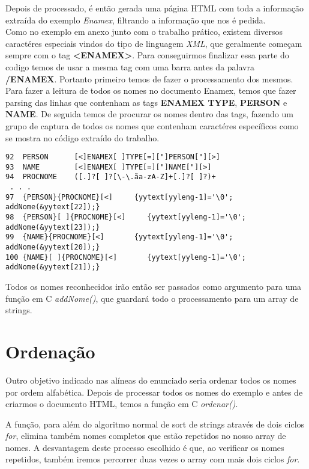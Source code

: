 \documentclass[11pt,a4paper]{report}
\begin{document}
Depois de processado, é então gerada uma página HTML com toda a informação extraída do exemplo \textit{Enamex}, filtrando a informação que nos é pedida.
~\\
Como no exemplo em anexo junto com o trabalho prático, existem diversos caractéres especiais vindos do tipo de linguagem \textit{XML}, que geralmente começam sempre com o tag \textbf{<ENAMEX>}. Para conseguirmos finalizar essa parte do codigo temos de usar a mesma tag com uma barra antes da palavra \textbf{/ENAMEX}. Portanto primeiro temos de fazer o processamento dos mesmos.
\\
Para fazer a leitura de todos os nomes no documento Enamex, temos que fazer parsing das linhas que contenham as tags \textbf{ENAMEX TYPE}, \textbf{PERSON} e \textbf{NAME}. De seguida temos de procurar os nomes dentro das tags, fazendo um grupo de captura de todos os nomes que contenham caractéres específicos como se mostra no código extraído do trabalho.
\begin{verbatim}
92  PERSON      [<]ENAMEX[ ]TYPE[=]["]PERSON["][>]
93  NAME        [<]ENAMEX[ ]TYPE[=]["]NAME["][>]
94  PROCNOME    ([.]?[ ]?[\-\.ãa-zA-Z]+[.]?[ ]?)+ 
 . . .
97  {PERSON}{PROCNOME}[<]     {yytext[yyleng-1]='\0'; addNome(&yytext[22]);}
98  {PERSON}[ ]{PROCNOME}[<]     {yytext[yyleng-1]='\0'; addNome(&yytext[23]);}
99  {NAME}{PROCNOME}[<]       {yytext[yyleng-1]='\0'; addNome(&yytext[20]);}
100 {NAME}[ ]{PROCNOME}[<]       {yytext[yyleng-1]='\0'; addNome(&yytext[21]);}
\end{verbatim}

Todos os nomes reconhecidos irão então ser passados como argumento para uma função em C \emph{addNome()}, que guardará todo o processamento para um array de strings.

\pagebreak
\section{Ordenação}
Outro objetivo indicado nas alíneas do enunciado seria ordenar todos os nomes por ordem alfabética. Depois de processar todos os nomes do exemplo e antes de criarmos o documento HTML, temos a função em C \emph{ordenar()}.

A função, para além do algoritmo normal de sort de strings através de dois ciclos \emph{for}, elimina também nomes completos que estão repetidos no nosso array de nomes. A desvantagem deste processo escolhido é que, ao verificar os nomes repetidos, também iremos percorrer duas vezes o array com mais dois ciclos \emph{for}.
\end{document}
